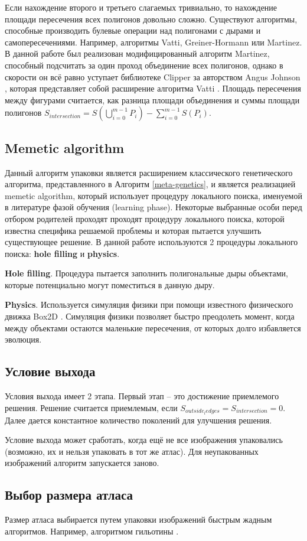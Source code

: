 \documentclass{fefu_thesis/cls/fefu}
\newcommand*\talgref[1]{Алгоритм \ref{#1}}
\begin{document}
    Если нахождение второго и третьего слагаемых тривиально, то нахождение площади пересечения всех полигонов довольно сложно. Существуют алгоритмы, способные производить булевые операции над полигонами с дырами и самопересечениями. Например, алгоритмы Vatti\cite{Vatti}, Greiner-Hormann\cite{GreinerHormann} или Martinez\cite{Martinez}. В данной работе был реализован модифицированный алгоритм Martinez\cite{Martinez}, способный подсчитать за один проход объединение всех полигонов, однако в скорости он всё равно уступает библиотеке Clipper за авторством Angus Johnson \cite{Clipper}, которая представляет собой расширение алгоритма Vatti \cite{Vatti}. Площадь пересечения между фигурами считается, как разница площади объединения и суммы площади полигонов $S_{intersection} = S\left(\bigcup\limits_{i = 0}^{m - 1} P_i\right) - \sum\limits_{i = 0}^{m - 1}S\left(P_i\right)$.

    \subsection{Memetic algorithm}
    Данный алгоритм упаковки является расширением классического генетического алгоритма, представленного в \talgref{meta-genetics}, и является реализацией memetic algorithm, который использует процедуру локального поиска, именуемой в литературе фазой обучения (learning phase). Некоторые выбранные особи перед отбором родителей проходят проходят процедуру локального поиска, которой известна специфика решаемой проблемы и которая пытается улучшить существующее решение. В данной работе используются 2 процедуры локального поиска: \textbf{hole filling} и \textbf{physics}.

    \textbf{Hole filling}. Процедура пытается заполнить полигональные дыры объектами, которые потенциально могут поместиться в данную дыру.

    \textbf{Physics}. Используется симуляция физики при помощи известного физического движка Box2D \cite{Box2D}. Симуляция физики позволяет быстро преодолеть момент, когда между объектами остаются маленькие пересечения, от которых долго избавляется эволюция.

    \subsection{Условие выхода}
    Условия выхода имеет 2 этапа. Первый этап -- это достижение приемлемого решения. Решение считается приемлемым, если $S_{outside_ledges} = S_{intersection} = 0$. Далее дается константное количество поколений для улучшения решения.

    Условие выхода может сработать, когда ещё не все изображения упаковались (возможно, их и нельзя упаковать в тот же атлас). Для неупакованных изображений алгоритм запускается заново.

    \subsection{Выбор размера атласа}
    Размер атласа выбирается путем упаковки изображений быстрым жадным алгоритмов. Например, алгоритмом гильотины \cite{ThousandWayToPackBin}.
    \newpage
    \printbibliography
\end{document}
